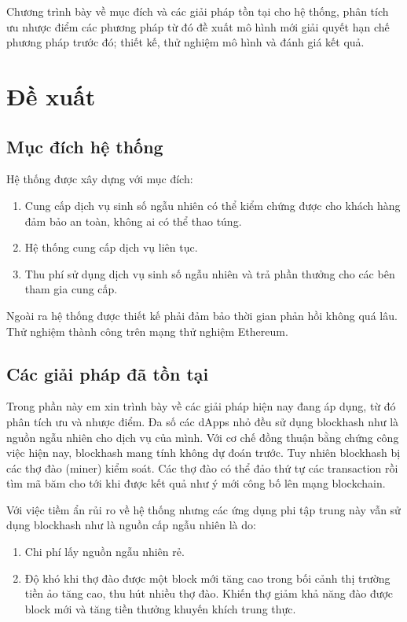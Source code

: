 \documentclass[../main.tex]{subfiles}
\begin{document}
Chương trình bày về mục đích và các giải pháp tồn tại cho hệ thống, phân tích ưu nhược điểm các phương pháp từ đó đề xuất mô hình mới giải quyết hạn chế phương pháp trước đó; thiết kế, thử nghiệm mô hình và đánh giá kết quả. 
\section{Đề xuất}
\subsection{Mục đích hệ thống}
Hệ thống được xây dựng với mục đích:
\begin{enumerate}
    \item Cung cấp dịch vụ sinh số ngẫu nhiên có thể kiểm chứng được cho khách hàng đảm bảo an toàn, không ai có thể thao túng.
    \item Hệ thống cung cấp dịch vụ liên tục.
    \item Thu phí sử dụng dịch vụ sinh số ngẫu nhiên và trả phần thưởng cho các bên tham gia cung cấp.
\end{enumerate}
Ngoài ra hệ thống được thiết kế phải đảm bảo thời gian phản hồi không quá lâu. Thử nghiệm thành công trên mạng thử nghiệm Ethereum.
\subsection{Các giải pháp đã tồn tại}
Trong phần này em xin trình bày về các giải pháp hiện nay đang áp dụng, từ đó phân tích ưu và nhược điểm.
Đa số các dApps nhỏ đều sử dụng blockhash như là nguồn ngẫu nhiên cho dịch vụ của mình. Với cơ chế đồng thuận bằng chứng công việc hiện nay, blockhash mang tính không dự đoán trước. Tuy nhiên blockhash bị các thợ đào (miner) kiểm soát. Các thợ đào có thể đảo thứ tự các transaction rồi tìm mã băm cho tới khi được kết quả như ý mới công bố lên mạng blockchain.

Với việc tiềm ẩn rủi ro về hệ thống nhưng các ứng dụng phi tập trung này vẫn sử dụng blockhash như là nguồn cấp ngẫu nhiên là do:
\begin{enumerate}
    \item Chi phí lấy nguồn ngẫu nhiên rẻ.
    \item Độ khó khi thợ đào được một block mới tăng cao trong bối cảnh thị trường tiền ảo tăng cao, thu hút nhiều thợ đào. Khiến thợ giảm khả năng đào được block mới và tăng tiền thưởng khuyến khích trung thực.
\end{enumerate}
\end{document}
